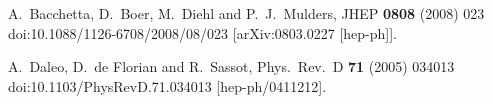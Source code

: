 \documentclass[10pt,a4paper]{article}
\begin{document}
\begin{thebibliography}{alp}
  A.~Bacchetta, D.~Boer, M.~Diehl and P.~J.~Mulders,
  JHEP {\bf 0808} (2008) 023
  doi:10.1088/1126-6708/2008/08/023
  [arXiv:0803.0227 [hep-ph]].

  A.~Daleo, D.~de Florian and R.~Sassot,
  Phys.\ Rev.\ D {\bf 71} (2005) 034013
  doi:10.1103/PhysRevD.71.034013
  [hep-ph/0411212].

\end{thebibliography}
\end{document}

